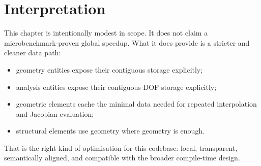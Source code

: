 \section{Interpretation}

This chapter is intentionally modest in scope.  It does not claim a
microbenchmark-proven global speedup.  What it does provide is a stricter and
cleaner data path:
\begin{itemize}[nosep]
  \item geometry entities expose their contiguous storage explicitly;
  \item analysis entities expose their contiguous DOF storage explicitly;
  \item geometric elements cache the minimal data needed for repeated
        interpolation and Jacobian evaluation;
  \item structural elements use geometry where geometry is enough.
\end{itemize}

That is the right kind of optimisation for this codebase: local, transparent,
semantically aligned, and compatible with the broader compile-time design.
